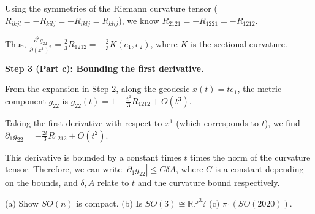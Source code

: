 \begin{solution}
Using the symmetries of the Riemann curvature tensor ($R_{ikjl} = -R_{kilj} = -R_{iklj} = R_{klij}$), we know $R_{2121} = -R_{1221} = -R_{1212}$.

Thus, $\frac{\partial^2 g_{22}}{\partial (x^1)^2} = \frac{2}{3} R_{1212} = -\frac{2}{3} K(e_1, e_2)$, where $K$ is the sectional curvature.

\textbf{Step 3 (Part c): Bounding the first derivative.}

From the expansion in Step 2, along the geodesic $x(t) = t e_1$, the metric component $g_{22}$ is $g_{22}(t) = 1 - \frac{t^2}{3} R_{1212} + O(t^3)$.

Taking the first derivative with respect to $x^1$ (which corresponds to $t$), we find $\partial_1 g_{22} = -\frac{2t}{3} R_{1212} + O(t^2)$.

This derivative is bounded by a constant times $t$ times the norm of the curvature tensor. Therefore, we can write $| \partial_1 g_{22} | \leq C \delta A$, where $C$ is a constant depending on the bounds, and $\delta, A$ relate to $t$ and the curvature bound respectively.
\end{solution}

\begin{exercise}
\label{geometry:2020:4}
(a) Show $SO(n)$ is compact. (b) Is $SO(3) \cong \mathbb{RP}^3$? (c) $\pi_1(SO(2020))$.
\end{exercise}

